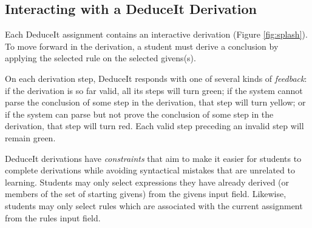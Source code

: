 \documentclass{sigchi}
\begin{document}
\subsection{Interacting with a DeduceIt Derivation}
Each DeduceIt assignment contains an interactive derivation (Figure \ref{fig:splash}). To move forward in the derivation, a student must derive a conclusion by applying the selected rule on the selected givens(s). 

On each derivation step, DeduceIt responds with one of several kinds of \textit{feedback}: if the derivation is so far valid, all its steps will turn green; if the system cannot parse the conclusion of some step in the derivation, that step will turn yellow; or if the system can parse but not prove the conclusion of some step in the derivation, that step will turn red. Each valid step preceding an invalid step will remain green.

DeduceIt derivations have \textit{constraints} that aim to make it easier for students to complete derivations while avoiding syntactical mistakes that are unrelated to learning. Students may only select expressions they have already derived (or members of the set of starting givens) from the givens input field. Likewise, students may only select rules which are associated with the current assignment from the rules input field.
\end{document}
